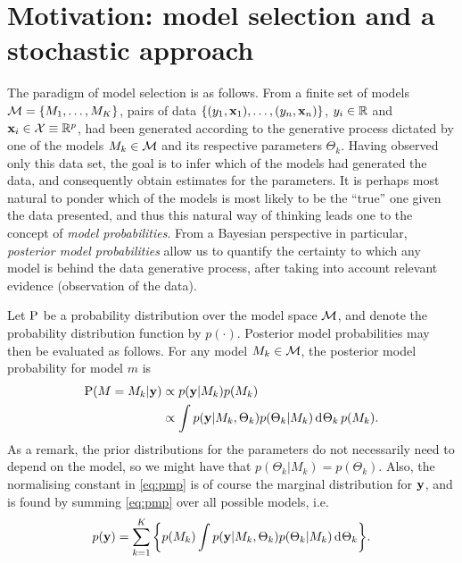 \documentclass[a4paper,showframe,11pt]{report}
\begin{document}

\section{Motivation: model selection and a stochastic approach}\label{sec:bvs-iprior}

The paradigm of model selection is as follows. 
From a finite set of models ${\mathcal M} = \{M_1,\dots,M_K\}$, pairs of data $\{(y_1,{\mathbf x}_1),\dots,(y_n,{\mathbf x}_n)\}$, $y_i\in\mathbb{R}$ and ${\mathbf x}_i\in{\mathcal X}\equiv\mathbb{R}^p$, had been generated according to the generative process dictated by one of the models $M_k \in {\mathcal M}$ and its respective parameters $\Theta_k$.
Having observed only this data set, the goal is to infer which of the models had generated the data, and consequently obtain estimates for the parameters.
It is perhaps most natural to ponder which of the models is most likely to be the ``true'' one given the data presented, and thus this natural way of thinking leads one to the concept of \emph{model probabilities}.
From a Bayesian perspective in particular, \emph{posterior model probabilities} allow us to quantify the certainty to which any model is behind the data generative process, after taking into account relevant evidence (observation of the data).

Let $\operatorname{P}$ be a probability distribution over the model space ${\mathcal M}$, and denote the probability distribution function by $p(\cdot)$.
Posterior model probabilities may then be evaluated as follows. 
For any model $M_k \in {\mathcal M}$, the posterior model probability for model $m$ is
\begin{align}\label{eq:pmp}
  \operatorname{P}(M=M_k|{\mathbf y}) &\propto p({\mathbf y}|M_k)p(M_k) \nonumber \\
  &\propto \int p({\mathbf y}|M_k,\Theta_k)p(\Theta_k|M_k) \operatorname{d}\hspace{0.5pt}\!\Theta_k \, p(M_k).
\end{align}
As a remark, the prior distributions for the parameters do not necessarily need to depend on the model, so we might have that $p(\Theta_k|M_k)=p(\Theta_k)$.
Also, the normalising constant in \cref{eq:pmp} is of course the marginal distribution for ${\mathbf y}$, and is found by summing \cref{eq:pmp} over all possible models, i.e.
\begin{align}\label{eq:normconst}
  p({\mathbf y}) = \sum_{k=1}^K \bigg\{ p(M_k) \int p({\mathbf y}|M_k,\Theta_k)p(\Theta_k|M_k) \operatorname{d}\hspace{0.5pt}\!\Theta_k \bigg\}.
\end{align}
\end{document}
